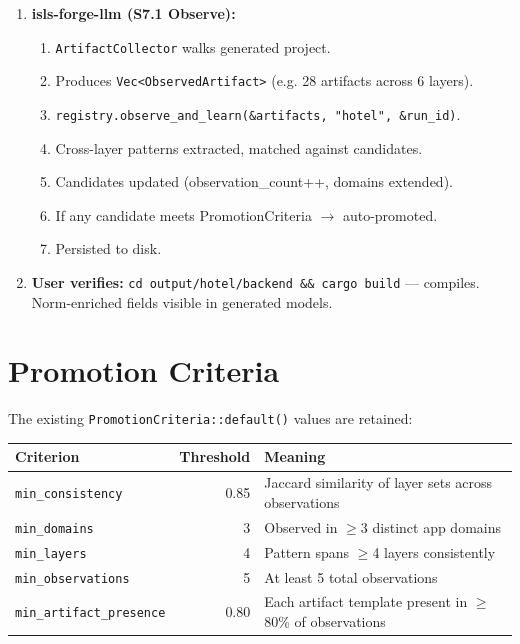 \documentclass[11pt,a4paper]{article}
\begin{document}
\begin{enumerate}
\item \textbf{isls-forge-llm (S7.1 Observe):}
      \begin{enumerate}[nosep,label=\alph*.]
      \item \texttt{ArtifactCollector} walks generated project.
      \item Produces \texttt{Vec<ObservedArtifact>} (e.g. 28 artifacts 
            across 6 layers).
      \item \texttt{registry.observe\_and\_learn(\&artifacts, "hotel", 
            \&run\_id)}.
      \item Cross-layer patterns extracted, matched against candidates.
      \item Candidates updated (observation\_count++, domains extended).
      \item If any candidate meets PromotionCriteria $\to$ auto-promoted.
      \item Persisted to disk.
      \end{enumerate}

\item \textbf{User verifies:} \texttt{cd output/hotel/backend \&\& 
      cargo build} --- compiles. Norm-enriched fields visible in 
      generated models.
\end{enumerate}


\section{Promotion Criteria}

The existing \texttt{PromotionCriteria::default()} values are retained:

\begin{longtable}{lrl}
\toprule
\textbf{Criterion} & \textbf{Threshold} & \textbf{Meaning} \\
\midrule
\texttt{min\_consistency}        & 0.85  & Jaccard similarity of layer 
                                            sets across observations \\
\texttt{min\_domains}            & 3     & Observed in $\geq$3 distinct 
                                            app domains \\
\texttt{min\_layers}             & 4     & Pattern spans $\geq$4 
                                            layers consistently \\
\texttt{min\_observations}       & 5     & At least 5 total 
                                            observations \\
\texttt{min\_artifact\_presence} & 0.80  & Each artifact template 
                                            present in $\geq$80\% of 
                                            observations \\
\bottomrule
\end{longtable}
\end{document}
